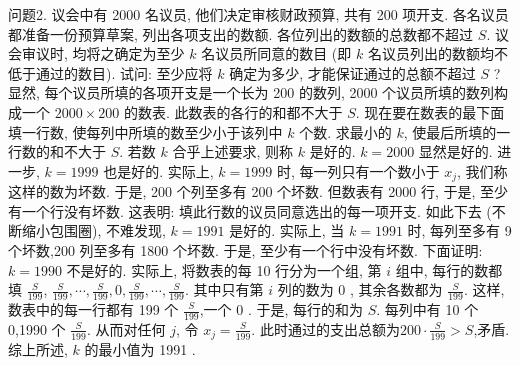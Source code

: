 问题2. 议会中有 2000 名议员, 他们决定审核财政预算, 共有 200 项开支.
各名议员都准备一份预算草案, 列出各项支出的数额.
各位列出的数额的总数都不超过 $S$. 议会审议时, 均将之确定为至少 $k$ 名议员所同意的数目 (即 $k$ 名议员列出的数额均不低于通过的数目). 试问: 至少应将 $k$ 确定为多少, 才能保证通过的总额不超过 $S$ ? 
显然, 每个议员所填的各项开支是一个长为 200 的数列, 2000 个议员所填的数列构成一个 $2000 \times 200$ 的数表.
此数表的各行的和都不大于 $S$. 现在要在数表的最下面填一行数, 使每列中所填的数至少小于该列中 $k$ 个数.
求最小的 $k$, 使最后所填的一行数的和不大于 $S$. 若数 $k$ 合乎上述要求, 则称 $k$ 是好的.
$k=2000$ 显然是好的.
进一步, $k=1999$ 也是好的.
实际上, $k=1999$ 时, 每一列只有一个数小于 $x_j$, 我们称这样的数为坏数.
于是, 200 个列至多有 200 个坏数.
但数表有 2000 行, 于是, 至少有一个行没有坏数.
这表明: 填此行数的议员同意选出的每一项开支.
如此下去 (不断缩小包围圈), 不难发现, $k=1991$ 是好的.
实际上, 当 $k=1991$ 时, 每列至多有 9 个坏数,200 列至多有 1800 个坏数.
于是, 至少有一个行中没有坏数.
下面证明: $k=1990$ 不是好的.
实际上, 将数表的每 10 行分为一个组, 第 $i$ 组中, 每行的数都填 $\frac{S}{199}$, $\frac{S}{199}, \cdots, \frac{S}{199}, 0, \frac{S}{199}, \cdots, \frac{S}{199}$. 其中只有第 $i$ 列的数为 0 , 其余各数都为 $\frac{S}{199}$. 这样, 数表中的每一行都有 199 个 $\frac{S}{199}$,一个 0 . 于是, 每行的和为 $S$. 每列中有 10 个 0,1990 个 $\frac{S}{199}$. 从而对任何 $j$, 令 $x_j=\frac{S}{199}$. 此时通过的支出总额为$200 \cdot \frac{S}{199}>S$,矛盾.
综上所述, $k$ 的最小值为 1991 .



